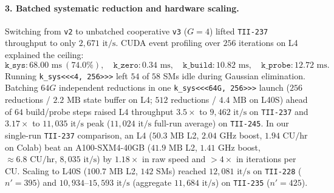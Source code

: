 \documentclass[11pt,a4paper]{article}
\begin{document}
\paragraph{3. Batched systematic reduction and hardware scaling.}
Switching from \texttt{v2} to unbatched cooperative \texttt{v3} ($G=4$) lifted \texttt{TII-237} throughput to only $2{,}671\text{ it/s}$. CUDA event profiling over $256$ iterations on L4 explained the ceiling:
\[
  \texttt{k\_sys}: 68.00\text{ ms}~(74.0\%), \quad
  \texttt{k\_zero}: 0.34\text{ ms}, \quad
  \texttt{k\_build}: 10.82\text{ ms}, \quad
  \texttt{k\_probe}: 12.72\text{ ms}.
\]
Running \texttt{k\_sys<<<4, 256>>>} left $54$ of $58$ SMs idle during Gaussian elimination. Batching $64G$ independent reductions in one \texttt{k\_sys<<<64G, 256>>>} launch ($256$ reductions / $2.2\text{ MB}$ state buffer on L4; $512$ reductions / $4.4\text{ MB}$ on L40S) ahead of $64$ build/probe steps raised L4 throughput $3.5\times$ to $9{,}462\text{ it/s}$ on \texttt{TII-237} and $3.17\times$ to $11{,}035\text{ it/s}$ peak ($11{,}024\text{ it/s}$ full-run average) on \texttt{TII-245}. In our single-run \texttt{TII-237} comparison, an L4 ($50.3\text{ MB}$ L2, $2.04\text{ GHz}$ boost, $1.94\text{ CU/hr}$ on Colab) beat an A100-SXM4-40GB ($41.9\text{ MB}$ L2, $1.41\text{ GHz}$ boost, $\approx 6.8\text{ CU/hr}$, $8{,}035\text{ it/s}$) by $1.18\times$ in raw speed and $>4\times$ in iterations per CU. Scaling to L40S ($100.7\text{ MB}$ L2, $142$ SMs) reached $12{,}081\text{ it/s}$ on \texttt{TII-228} ($n'=395$) and $10{,}934\text{--}15{,}593\text{ it/s}$ (aggregate $11{,}684\text{ it/s}$) on \texttt{TII-235} ($n'=425$).
\end{document}
